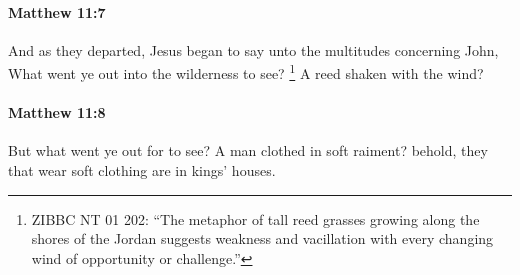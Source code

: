 		\paragraph{Matthew 11:7} %
			\label{MATTHEW-11-7}

			And as they departed, Jesus began to say unto the multitudes concerning John, What went ye out into the wilderness to see?
				\footnote{%
					ZIBBC NT 01 202: ``The metaphor of tall reed grasses growing along the shores of the Jordan suggests weakness and vacillation with every changing wind of opportunity or challenge.''
					}%
			A reed shaken with the wind?

			\begin{framed}
			\scriptsize
				\begin{compactdesc}
					\item[SBLG] 
				\end{compactdesc}
			\end{framed}

		\paragraph{Matthew 11:8} %
			\label{MATTHEW-11-8}

			But what went ye out for to see? A man clothed in soft raiment? behold, they that wear soft clothing are in kings' houses.


